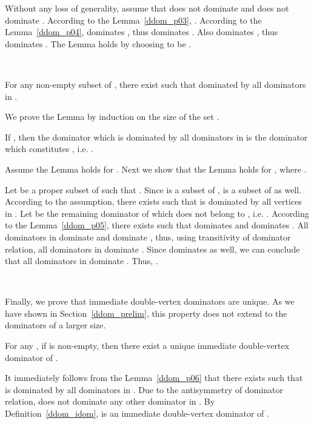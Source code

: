 \documentclass{llncs}
\begin{document}
Without any loss of generality, assume that  does not dominate
 and  does not dominate . According to
the Lemma~\ref{ddom_p03}, . According to the Lemma~\ref{ddom_p04},
 dominates , thus  dominates
. Also  dominates , thus 
dominates . The Lemma holds by choosing  to be
.
\begin{flushright}
 \\
\end{flushright}

\begin{lemma} \label{ddom_p06}
For any non-empty subset  of , there exist  such that  dominated by all dominators in .
\end{lemma}

We prove the Lemma by induction on the size of the set .

If , then the dominator which is dominated by all dominators in
 is the dominator which constitutes , i.e. .

Assume the Lemma holds for . Next we show that the Lemma holds
for , where .

Let  be a proper subset of  such that . Since  is
a subset of ,  is a subset of  as well. According to
the assumption, there exists  such that 
is dominated by all vertices in .  Let  be the remaining
dominator of  which does not belong to , i.e. .  According to the Lemma~\ref{ddom_p05}, there exists 
such that  dominates  and 
dominates .  All dominators in  dominate 
and  dominate , thus, using transitivity of
dominator relation, all dominators in  dominate
. Since  dominates  as well, we
can conclude that all dominators in  dominate . Thus,
.
\begin{flushright}
 \\
\end{flushright}

Finally, we prove that immediate double-vertex dominators are unique.
As we have shown in Section~\ref{ddom_prelim}, this property does not extend
to the dominators of a larger size.

\begin{theorem} \label{ddom_p08}
For any , if  is non-empty, then there exist a unique immediate double-vertex
dominator of .
\end{theorem}

 It immediately follows from the Lemma~\ref{ddom_p06} that there exists
 such that  is dominated by all
dominators in . Due to the antisymmetry of dominator
relation,  does not dominate any other dominator in
. By Definition~\ref{ddom_idom},  is an immediate
double-vertex dominator of .
\end{document}
